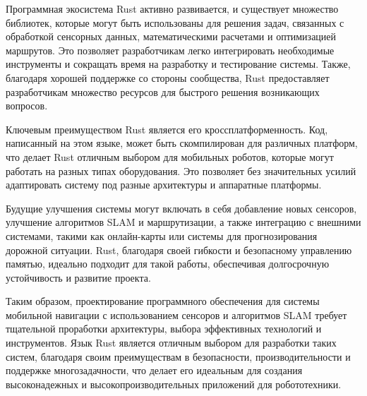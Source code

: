 Программная экосистема Rust активно развивается, и существует множество
библиотек, которые могут быть использованы для решения задач, связанных с
обработкой сенсорных данных, математическими расчетами и оптимизацией маршрутов.
Это позволяет разработчикам легко интегрировать необходимые инструменты и
сокращать время на разработку и тестирование системы. Также, благодаря хорошей
поддержке со стороны сообщества, Rust предоставляет разработчикам множество
ресурсов для быстрого решения возникающих вопросов.

Ключевым преимуществом Rust является его кроссплатформенность. Код, написанный
на этом языке, может быть скомпилирован для различных платформ, что делает Rust
отличным выбором для мобильных роботов, которые могут работать на разных типах
оборудования. Это позволяет без значительных усилий адаптировать систему под
разные архитектуры и аппаратные платформы.

Будущие улучшения системы могут включать в себя добавление новых сенсоров,
улучшение алгоритмов SLAM и маршрутизации, а также интеграцию с внешними
системами, такими как онлайн-карты или системы для прогнозирования дорожной
ситуации. Rust, благодаря своей гибкости и безопасному управлению памятью,
идеально подходит для такой работы, обеспечивая долгосрочную устойчивость и
развитие проекта.

Таким образом, проектирование программного обеспечения для системы мобильной
навигации с использованием сенсоров и алгоритмов SLAM требует тщательной
проработки архитектуры, выбора эффективных технологий и инструментов. Язык Rust
является отличным выбором для разработки таких систем, благодаря своим
преимуществам в безопасности, производительности и поддержке многозадачности,
что делает его идеальным для создания высоконадежных и высокопроизводительных
приложений для робототехники.
